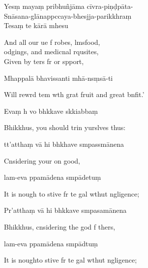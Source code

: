 Yesṃ mayaṃ pribhuñjāma cīvra-piṇḍpāta-\\
Snāsana-glānappccaya-bhesjja-parikkhraṃ\\
Tesaṃ te kārā mhesu

\begin{english}
  And all our ue f robes, lmsfood,\\
  odgings, and medicnal rqusites,\\
  Given by ters fr or spport,
\end{english}

Mhappalā bhavissanti mhā-nsṃsā-ti

\begin{english}
  Will rewrd tem wth grat fruit and great bnfit.'
\end{english}

Evaṃ h vo bhkkave skkiabbaṃ

\begin{english}
  Bhikkhus, you should trin yurslves thus:
\end{english}

tt'atthaṃ vā hi bhkhave smpassmānena

\begin{english}
  Cnsidering your on good,
\end{english}

lam-eva ppamādena smpādetuṃ

\begin{english}
  It is nough to stive fr te gal wthut ngligence;
\end{english}

Pr'atthaṃ vā hi bhkkave smpasamānena

\begin{english}
  Bhikkhus, cnsidering the god f thers,
\end{english}

lam-eva ppamādena smpādtuṃ

\begin{english}
  It is noughto stive fr te gal wthut ngligence;
\end{english}

